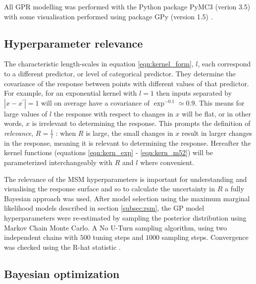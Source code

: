 All GPR modelling was performed with the Python package PyMC3 (verion 3.5) \cite{salvatierProbabilisticProgrammingPython2016} with some visualisation performed using package GPy (version 1.5) \cite{gpy2014}. 

\subsection{Hyperparameter relevance}\label{sub:msm_meth_rel}
The characteristic length-scales in equation \ref{eqn:kernel_form}, $l$, each correspond to a different predictor, or level of categorical predictor. They determine the covariance of the response between points with different values of that predictor. For example, for an exponential kernel with $l=1$ then inputs separated by $|x-x^{\prime}|= 1$ will on average have a covariance of $\exp^{-0.1}\simeq 0.9$. This means for large values of $l$ the response with respect to changes in $x$ will be flat, or in other words, $x$ is irrelevant to determining the response. This prompts the definition of \emph{relevance}, $R = \frac{1}{l}$ \cite{bernardo1998regression,bergstrajamesbergstraRandomSearchHyperParameter2012}: when $R$ is large, the small changes in $x$ result in larger changes in the response, meaning it is relevant to determining the response. Hereafter the kernel functions (equations \ref{eqn:kern_exp} - \ref{eqn:kern_m52}) will be parameterized interchangeably with $R$ and $l$ where convenient.  

The relevance of the MSM hyperparameters is important for understanding and visualising the response surface and so to calculate the uncertainty in $R$ a fully Bayesian approach was used. After model selection using the maximum marginal likelihood models described in section \ref{subsec:rsm}, the GP model hyperparameters were re-estimated by sampling the posterior distribution using Markov Chain Monte Carlo. A No U-Turn sampling algorithm, using two independent chains with $500$ tuning steps and $1000$ sampling steps. Convergence was checked using the R-hat statistic \cite{vehtariRanknormalizationFoldingLocalization2020}. 

\subsection{Bayesian optimization}\label{subsec:bayes_opt}

